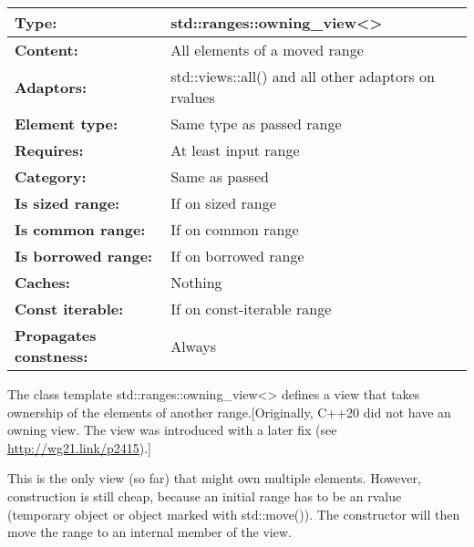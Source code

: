 \begin{longtable}[c]{|l|l|}
\hline
\textbf{Type:}                 & std::ranges::owning\_view\textless{}\textgreater{}  \\ \hline
\endfirsthead
%
\endhead
%
\textbf{Content:}              & All elements of a moved range                       \\ \hline
\textbf{Adaptors:}             & std::views::all() and all other adaptors on rvalues \\ \hline
\textbf{Element type:}         & Same type as passed range                           \\ \hline
\textbf{Requires:}             & At least input range                                \\ \hline
\textbf{Category:}             & Same as passed                                      \\ \hline
\textbf{Is sized range:}       & If on sized range                                   \\ \hline
\textbf{Is common range:}      & If on common range                                  \\ \hline
\textbf{Is borrowed range:}    & If on borrowed range                                \\ \hline
\textbf{Caches:}               & Nothing                                             \\ \hline
\textbf{Const iterable:}       & If on const-iterable range                          \\ \hline
\textbf{Propagates constness:} & Always                                              \\ \hline
\end{longtable}

The class template std::ranges::owning\_view<> defines a view that takes ownership of the elements of another range.[Originally, C++20 did not have an owning view. The view was introduced with a later fix (see \url{http://wg21.link/p2415}).]

This is the only view (so far) that might own multiple elements. However, construction is still cheap, because an initial range has to be an rvalue (temporary object or object marked with std::move()). The constructor will then move the range to an internal member of the view.

